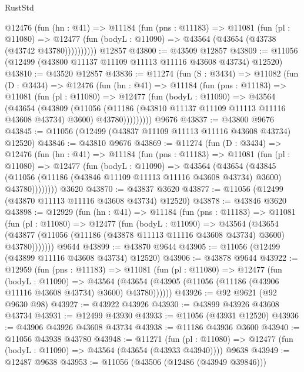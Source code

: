 \begin{lexlean}{RustStd}
\begin{coremodule}
        @12476
          (fun (hn : @41) =>
          @11184
            (fun (pns : @11183) =>
            @11081
              (fun (pl : @11080) =>
              @12477 (fun (bodyL : @11090) => @43564 (@43654 (@43738 (@43742 @43780))))))))))
    @12857
@43800 := @43509 @12857
@43809 := @11056 (@12499 (@43800 @11137 @11109 @11113 @11116 @43608 @43734) @12520)
@43810 := @43520 @12857
@43836 := @11274
    (fun (S : @3434) =>
    @11082
      (fun (D : @3434) =>
      @12476
        (fun (hn : @41) =>
        @11184
          (fun (pns : @11183) =>
          @11081
            (fun (pl : @11080) =>
            @12477
              (fun (bodyL : @11090) =>
              @43564
                (@43654
                  (@43809
                    (@11056
                      (@11186 (@43810 @11137 @11109 @11113 @11116 @43608 @43734) @3600)
                      @43780)))))))))
    @9676
@43837 := @43800 @9676
@43845 := @11056 (@12499 (@43837 @11109 @11113 @11116 @43608 @43734) @12520)
@43846 := @43810 @9676
@43869 := @11274
    (fun (D : @3434) =>
    @12476
      (fun (hn : @41) =>
      @11184
        (fun (pns : @11183) =>
        @11081
          (fun (pl : @11080) =>
          @12477
            (fun (bodyL : @11090) =>
            @43564
              (@43654
                (@43845
                  (@11056 (@11186 (@43846 @11109 @11113 @11116 @43608 @43734) @3600) @43780))))))))
    @3620
@43870 := @43837 @3620
@43877 := @11056 (@12499 (@43870 @11113 @11116 @43608 @43734) @12520)
@43878 := @43846 @3620
@43898 := @12929
    (fun (hn : @41) =>
    @11184
      (fun (pns : @11183) =>
      @11081
        (fun (pl : @11080) =>
        @12477
          (fun (bodyL : @11090) =>
          @43564
            (@43654
              (@43877 (@11056 (@11186 (@43878 @11113 @11116 @43608 @43734) @3600) @43780)))))))
    @9644
@43899 := @43870 @9644
@43905 := @11056 (@12499 (@43899 @11116 @43608 @43734) @12520)
@43906 := @43878 @9644
@43922 := @12959
    (fun (pns : @11183) =>
    @11081
      (fun (pl : @11080) =>
      @12477
        (fun (bodyL : @11090) =>
        @43564 (@43654 (@43905 (@11056 (@11186 (@43906 @11116 @43608 @43734) @3600) @43780))))))
@43926 := @92 @9621 (@92 @9630 @98)
@43927 := @43922 @43926
@43930 := @43899 @43926 @43608 @43734
@43931 := @12499 @43930
@43933 := @11056 (@43931 @12520)
@43936 := @43906 @43926 @43608 @43734
@43938 := @11186 @43936 @3600
@43940 := @11056 @43938 @43780
@43948 := @11271
    (fun (pl : @11080) => @12477 (fun (bodyL : @11090) => @43564 (@43654 (@43933 @43940))))
    @9638
@43949 := @12487 @9638
@43953 := @11056 (@43506 (@12486 (@43949 @39846)))

\end{coremodule}
\end{lexlean}
